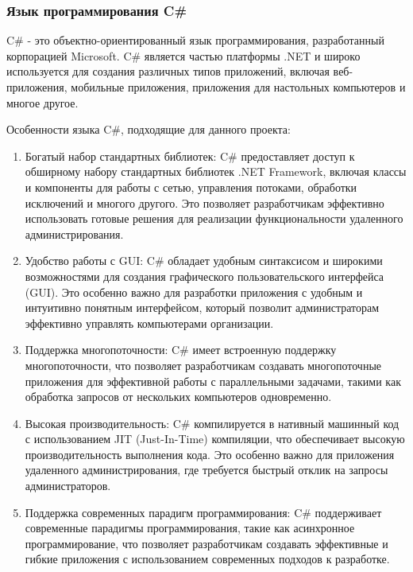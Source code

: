 \subsubsection{Язык программирования C\#}

C\# - это объектно-ориентированный язык программирования, разработанный корпорацией Microsoft. C\# является частью платформы .NET и широко используется для создания различных типов приложений, включая веб-приложения, мобильные приложения, приложения для настольных компьютеров и многое другое.

Особенности языка C\#, подходящие для данного проекта:
\begin{enumerate}
	\item Богатый набор стандартных библиотек: C\# предоставляет доступ к обширному набору стандартных библиотек .NET Framework, включая классы и компоненты для работы с сетью, управления потоками, обработки исключений и многого другого. Это позволяет разработчикам эффективно использовать готовые решения для реализации функциональности удаленного администрирования.

	\item Удобство работы с GUI: C\# обладает удобным синтаксисом и широкими возможностями для создания графического пользовательского интерфейса (GUI). Это особенно важно для разработки приложения с удобным и интуитивно понятным интерфейсом, который позволит администраторам эффективно управлять компьютерами организации.

	\item Поддержка многопоточности: C\# имеет встроенную поддержку многопоточности, что позволяет разработчикам создавать многопоточные приложения для эффективной работы с параллельными задачами, такими как обработка запросов от нескольких компьютеров одновременно.

	\item Высокая производительность: C\# компилируется в нативный машинный код с использованием JIT (Just-In-Time) компиляции, что обеспечивает высокую производительность выполнения кода. Это особенно важно для приложения удаленного администрирования, где требуется быстрый отклик на запросы администраторов.

	\item Поддержка современных парадигм программирования: C\# поддерживает современные парадигмы программирования, такие как асинхронное программирование, что позволяет разработчикам создавать эффективные и гибкие приложения с использованием современных подходов к разработке.
\end{enumerate}

